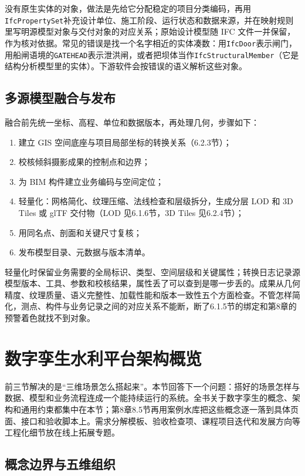 没有原生实体的对象，做法是先给它分配稳定的项目分类编码，再用\texttt{IfcPropertySet}补充设计单位、施工阶段、运行状态和数据来源，并在映射规则里写明源模型对象与交付对象的对应关系；原始设计模型随 IFC 文件一并保留，作为核对依据。常见的错误是找一个名字相近的实体凑数：用\texttt{IfcDoor}表示闸门，用船闸语境的\texttt{GATEHEAD}表示泄洪闸，或者把坝体当作\texttt{IfcStructuralMember}（它是结构分析模型里的实体）。下游软件会按错误的语义解析这些对象。

\subsection{多源模型融合与发布}

融合前先统一坐标、高程、单位和数据版本，再处理几何，步骤如下：
\begin{enumerate}
\item 建立 GIS 空间底座与项目局部坐标的转换关系（6.2.3节）；
\item 校核倾斜摄影成果的控制点和边界；
\item 为 BIM 构件建立业务编码与空间定位；
\item 轻量化：网格简化、纹理压缩、法线检查和层级拆分，生成分层 LOD 和 3D Tiles 或 glTF 交付物（LOD 见6.1.6节，3D Tiles 见6.2.4节）；
\item 用同名点、剖面和关键尺寸复核；
\item 发布模型目录、元数据与版本清单。
\end{enumerate}

轻量化时保留业务需要的全局标识、类型、空间层级和关键属性；转换日志记录源模型版本、工具、参数和校核结果，属性丢了可以查到是哪一步丢的。成果从几何精度、纹理质量、语义完整性、加载性能和版本一致性五个方面检查。不管怎样简化，测点、构件与业务记录之间的对应关系不能断，断了6.1.5节的绑定和第8章的预警着色就找不到对象。

\section{数字孪生水利平台架构概览}\label{sec:ch06-twin-overview}

前三节解决的是“三维场景怎么搭起来”。本节回答下一个问题：搭好的场景怎样与数据、模型和业务流程连成一个能持续运行的系统。全书关于数字孪生的概念、架构和通用约束都集中在本节；第8章8.5节再用案例水库把这些概念逐一落到具体页面、接口和验收脚本上。需求分解模板、验收检查项、课程项目迭代和发展方向等工程化细节放在线上拓展专题。

\subsection{概念边界与五维组织}

